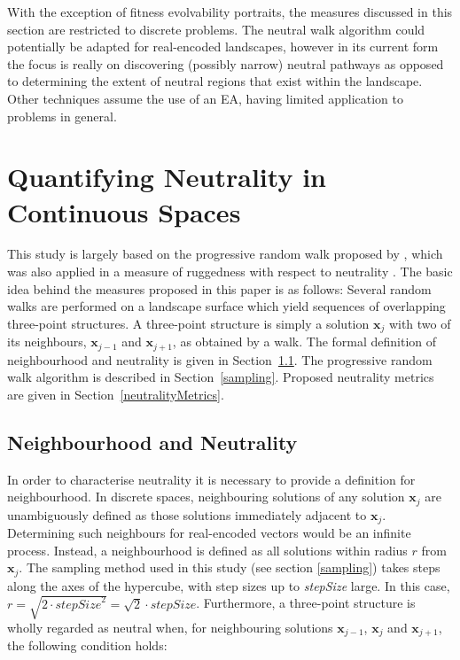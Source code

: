\documentclass[conference]{IEEEtran}
\renewcommand{\vec}[1]{\mathbf{#1}}
\begin{document}
With the exception of fitness evolvability portraits, the measures discussed in this section are restricted to discrete problems. The neutral walk algorithm could potentially be adapted for real-encoded landscapes, however in its current form the focus is really on discovering (possibly narrow) neutral pathways as opposed to determining the extent of neutral regions that exist within the landscape. Other techniques assume the use of an EA, having limited application to problems in general.

\section{Quantifying Neutrality in Continuous Spaces}
\label{continuousNeutrality}
This study is largely based on the progressive random walk proposed by \citet{malan2014progressive}, which was also applied in a measure of ruggedness with respect to neutrality \cite{malan2009quantifying}. The basic idea behind the measures proposed in this paper is as follows: Several random walks are performed on a landscape surface which yield sequences of overlapping three-point structures. A three-point structure is simply a solution $\vec{x}_j$ with two of its neighbours, $\vec{x}_{j-1}$ and $\vec{x}_{j+1}$, as obtained by a walk. The formal definition of neighbourhood and neutrality is given in Section~\ref{neutralityMeasures}. The progressive random walk \cite{malan2014progressive} algorithm is described in Section~\ref{sampling}. Proposed neutrality metrics are given in Section~\ref{neutralityMetrics}.

\subsection{Neighbourhood and Neutrality}
\label{neutralityMeasures}
In order to characterise neutrality it is necessary to provide a definition for neighbourhood. In discrete spaces, neighbouring solutions of any solution $\vec{x}_j$ are unambiguously defined as those solutions immediately adjacent to $\vec{x}_j$. Determining such neighbours for real-encoded vectors would be an infinite process. Instead, a neighbourhood is defined as all solutions within radius $r$ from $\vec{x}_j$. The sampling method used in this study (see section \ref{sampling}) takes steps along the axes of the hypercube, with step sizes up to \textit{stepSize} large. In this case, $r = \sqrt{2 \cdot {\textit{stepSize}}^2}= \sqrt{2} \cdot \textit{stepSize}$. Furthermore, a three-point structure is wholly regarded as neutral when, for neighbouring solutions $\vec{x}_{j-1}$, $\vec{x}_j$ and $\vec{x}_{j+1}$, the following condition holds:
\end{document}
